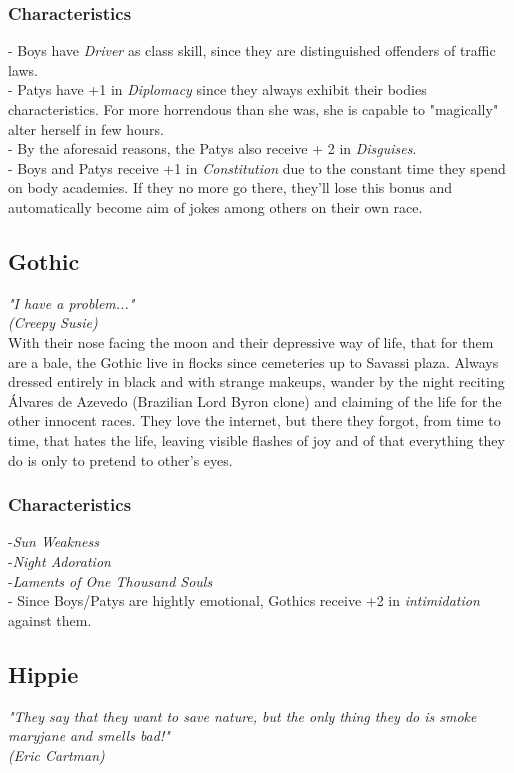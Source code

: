\documentclass[ letterpaper,12pt]{article}
\begin{document}
\subsubsection{Characteristics}
- Boys have {\it Driver} as class skill, since they are distinguished offenders of traffic laws.\\
- Patys have +1 in {\it Diplomacy} since they always exhibit their bodies characteristics. For more horrendous than she was, she is capable to "magically" alter herself in few hours.\\
- By the aforesaid reasons, the Patys also receive + 2 in {\it Disguises}.\\
- Boys and Patys receive +1 in {\it Constitution} due to the constant time they spend on body academies. If they no more go there, they'll lose this bonus and automatically become aim of jokes among others on their own race.\\

\subsection{Gothic}
{\it "I have a problem..."
\\(Creepy Susie)}\\

With their nose facing the moon and their depressive way of life, that for them are a bale, the Gothic live in flocks since cemeteries up to Savassi plaza.  Always dressed entirely in black and with strange makeups, wander by the night reciting Álvares de Azevedo (Brazilian Lord Byron clone) and claiming of the life for the other innocent races. They love the internet, but there they forgot, from time to time, that hates the life, leaving visible flashes of joy and of that everything they do is only to pretend to other's eyes. 

\subsubsection{Characteristics}
-{\it Sun Weakness}\\
-{\it Night Adoration}\\
-{\it Laments of One Thousand Souls}\\
- Since Boys/Patys are hightly emotional, Gothics receive +2 in {\it intimidation} against them.

\subsection{Hippie}
{\it "They say that they want to save nature, but the only thing they do is smoke maryjane and smells bad!"\\ (Eric Cartman)}\\
\end{document}
